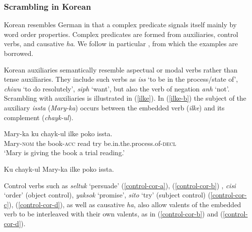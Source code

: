 \documentclass[output=paper]{langsci/langscibook}
\begin{document}
	
	\subsubsection{Scrambling in Korean}
	
	Korean resembles German in that a complex predicate signals itself mainly by word order properties. Complex predicates are formed from auxiliaries, control verbs, and causative  \textit{ha}. We follow in particular \cite{CC1998}, from which the examples are borrowed.
	
	Korean auxiliaries semantically resemble aspectual or modal verbs rather than tense auxiliaries. They include such verbs as  \textit{iss} `to be in the process/state of',   \textit{chiwu} `to do resolutely',  \textit{siph} `want', but also the verb of negation  \textit{anh} `not'. Scrambling with auxiliaries is illustrated in (\ref{ilke}). In (\ref{ilke-b}) the subject of the auxiliary \textit{issta} (\textit{Mary-ka}) occurs between
	the embedded verb (\textit{ilke}) and its complement (\textit{chayk-ul}).
	
	
	\begin{exe}
		\ex  \label{ilke}
		
		\begin{xlist} 
			
			\ex \label{ilke-a}
			\gll Mary-ka	 ku chayk-ul    ilke  poko  issta.\\
			Mary-\textsc{nom}  the book-\textsc{acc} read try be.in.the.process.of-\textsc{decl}\\
			\glt `Mary is giving the book a trial reading.'
			
			\ex \label{ilke-b}
			Ku chayk-ul  Mary-ka  ilke  poko  issta.
			
		\end{xlist}
	\end{exe}
	
	Control verbs such as \textit{seltuk} `persuade'  (\ref{control-cor-a}), (\ref{control-cor-b}) , \textit{cisi} `order' (object control), \textit{yaksok} `promise',  \textit{sito} `try' (subject control) (\ref{control-cor-c}), (\ref{control-cor-d}), as well as causative \textit{ha}, also allow valents of the embedded verb to be interleaved with their own valents, as in (\ref{control-cor-b}) and (\ref{control-cor-d}).  
	
\end{document}
